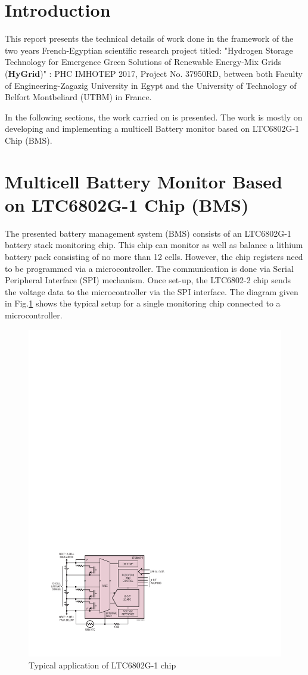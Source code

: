 \documentclass[%
DIV=12,
abstract=on
12pt,			%
]
{scrartcl} %
\begin{document}
    \clearpage
    \section{Introduction}
This report presents the technical details of work done in the framework of the two years French-Egyptian scientific research project titled: "Hydrogen Storage Technology for Emergence Green Solutions of Renewable Energy-Mix Grids (\textbf{HyGrid})" : PHC IMHOTEP 2017, Project No. 37950RD, between both Faculty of Engineering-Zagazig University in Egypt and the University of Technology of Belfort Montbeliard (UTBM) in France.


In the following sections, the work carried on is presented. The work is mostly on developing and implementing a multicell Battery monitor based on LTC6802G-1 Chip (BMS).

\section{Multicell Battery Monitor Based on LTC6802G-1 Chip (BMS)}
The presented battery management system (BMS) consists of an LTC6802G-1 battery stack monitoring chip. This chip can monitor as well as balance a lithium battery pack consisting of no more than 12 cells. However, the chip registers need to be programmed via a microcontroller. The communication is done via Serial Peripheral Interface (SPI) mechanism. Once set-up, the LTC6802-2 chip sends the voltage data to the microcontroller via the SPI interface. The diagram given in Fig.\ref{fig:typicalapplication} shows the typical setup for a single monitoring chip connected to a microcontroller. 
\begin{figure}[h]
    \centering
    \includegraphics[width=0.8\linewidth]{figures/typicalApplication}
    \caption{Typical application of LTC6802G-1 chip}
    \label{fig:typicalapplication}
\end{figure}
\end{document}
